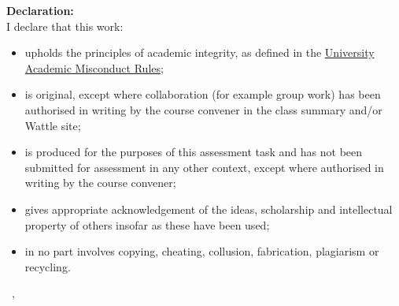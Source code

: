 {\sffamily\bfseries\Large Declaration:}\\

I declare that this work:\\

\begin{itemize}
  \item upholds the principles of academic integrity, as defined in the \href{https://www.anu.edu.au/about/governance/legislation}{University Academic Misconduct Rules};
  \item is original, except where collaboration (for example group work) has been authorised in writing by the course convener in the class summary and/or Wattle site;
  \item is produced for the purposes of this assessment task and has not been submitted for assessment in any other context, except where authorised in writing by the course convener;
  \item gives appropriate acknowledgement of the ideas, scholarship and intellectual property of others insofar as these have been used;
  \item in no part involves copying, cheating, collusion, fabrication, plagiarism or recycling.
\end{itemize}


\vspace{1 cm}
\hfill \the\year\ \monthname, \AuthorName
\newpage


